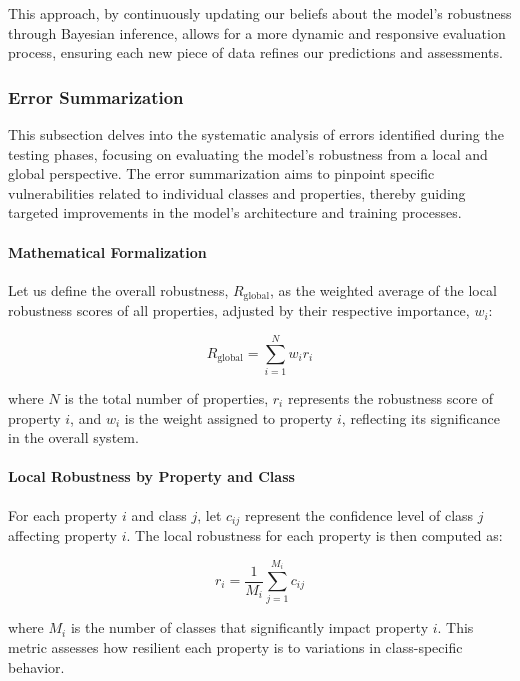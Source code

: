 \documentclass[10pt, conference, a4paper, final]{IEEEtran}
\begin{document}
This approach, by continuously updating our beliefs about the model’s robustness through Bayesian inference, allows for a more dynamic and responsive evaluation process, ensuring each new piece of data refines our predictions and assessments.


\subsubsection{Error Summarization}
This subsection delves into the systematic analysis of errors identified during the testing phases, focusing on evaluating the model's robustness from a local and global perspective. The error summarization aims to pinpoint specific vulnerabilities related to individual classes and properties, thereby guiding targeted improvements in the model's architecture and training processes.

\paragraph{Mathematical Formalization}
Let us define the overall robustness, \( R_{\text{global}} \), as the weighted average of the local robustness scores of all properties, adjusted by their respective importance, \( w_i \):

\begin{equation}
    R_{\text{global}} = \sum_{i=1}^N w_i r_i
\end{equation}

where \( N \) is the total number of properties, \( r_i \) represents the robustness score of property \( i \), and \( w_i \) is the weight assigned to property \( i \), reflecting its significance in the overall system.

\paragraph{Local Robustness by Property and Class}
For each property \( i \) and class \( j \), let \( c_{ij} \) represent the confidence level of class \( j \) affecting property \( i \). The local robustness for each property is then computed as:

\begin{equation}
    r_i = \frac{1}{M_i} \sum_{j=1}^{M_i} c_{ij}
\end{equation}

where \( M_i \) is the number of classes that significantly impact property \( i \). This metric assesses how resilient each property is to variations in class-specific behavior.
\end{document}
